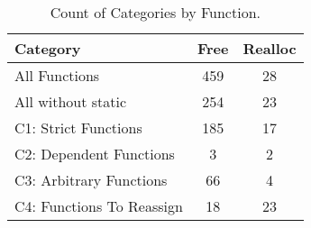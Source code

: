 \begin{table}[H]
   \begin{center}
   \begin{tabularx}{0.6\linewidth}{l|c|c}

      Category & Free & Realloc \\
      \hline

      All Functions& 459 & 28 \\

      All without static& 254 & 23 \\

      C1: Strict Functions& 185 & 17 \\

      C2: Dependent Functions& 3 & 2 \\

      C3: Arbitrary Functions& 66 & 4 \\

      C4: Functions To Reassign& 18 & 23 \\

   \end{tabularx}
\end{center}
   \caption{Count of Categories by Function.}
   \label{tab:categories:overview}
\end{table}

